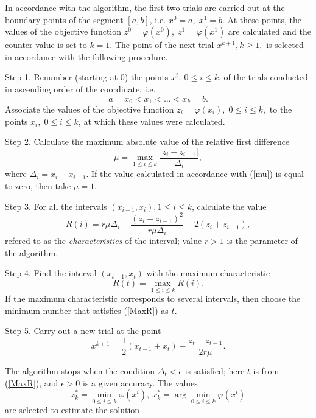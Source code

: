 \documentclass[entropy,article,submit,moreauthors,pdftex]{Definitions/mdpi}
\begin{document}
In accordance with the algorithm, the first two trials are carried out at the boundary points of the segment $[a,b]$, i.e. $x^0=a,\;x^1=b$. 
At these points, the values of the objective function  $z^0=\varphi(x^0),\;z^1=\varphi(x^1)$ are calculated and the counter value is set to $k=1$. 
The point of the next trial $x^{k+1}, k\geq 1,$ is selected in accordance with the following procedure.

 Step 1. Renumber  (starting at 0) the points $x^i,\:0\leq i\leq k$, of the trials conducted  in ascending order of the coordinate, i.e.
\begin{equation}\label{xt}
a=x_0<x_1<\ldots <x_{k}=b.
\end{equation} 
Associate the values of the objective function $z_i=\varphi(x_i), \; 0\leq i\leq k,$ to the points $x_i, \; 0\leq i\leq k$, at which these values were calculated.

Step 2. Calculate the maximum absolute value of the relative first difference
\begin{equation}\label{mu}
\mu=\max_{1\leq i\leq k}\frac{\left|z_i-z_{i-1}\right|}{\Delta_i},
\end{equation}
where $\Delta_i = x_i-x_{i-1}$. If the value calculated in accordance with (\ref{mu}) is equal to zero, then take $\mu = 1$.

Step 3. For all the intervals $(x_{i-1},x_i),1\leq i\leq k$,  calculate the value
\begin{equation}\label{R}
R(i)=r\mu\Delta_i+\frac{(z_i-z_{i-1})^2}{r\mu\Delta_i}-2(z_i+z_{i-1}),
\end{equation} 
refered to as the \textit{characteristics} of the interval; value $r>1$ is the parameter of the algorithm. 

Step 4. Find the interval $(x_{t-1},x_t)$ with the maximum characteristic
\begin{equation}\label{MaxR}
R(t)=\max_{1\leq i\leq {k}}R(i).
\end{equation}
If the maximum characteristic corresponds to several intervals, then choose the minimum number that satisfies (\ref{MaxR}) as $t$.

Step 5. Carry out a new trial at the point
\begin{equation}\label{xk1}
x^{k+1}=\frac{1}{2}(x_{t-1}+x_t) - \frac{z_t-z_{t-1}}{2r\mu}.
\end{equation}

The algorithm stops when the condition  $\Delta_t<\epsilon$ is satisfied; here $t$ is from (\ref{MaxR}), and $\epsilon>0$ is a given accuracy. 
The values
\[
z_k^\ast=\min_{0\leq i \leq k}\varphi(x^i), \ x_k^\ast=\arg \min_{0\leq i \leq
 k}\varphi(x^i)
\] 
are selected to estimate the solution
\end{document}
